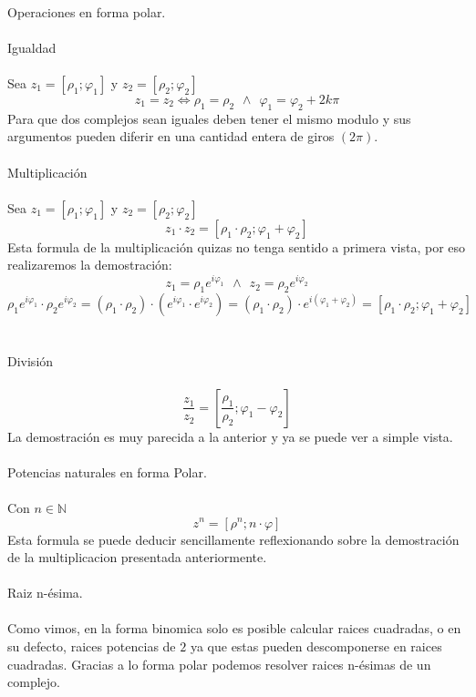 \documentclass[]{article}
\begin{document}
\\
\huge Operaciones en forma polar.
\\
\\
\Large Igualdad
\normalsize
\\
\\
Sea $z_1=[\rho_1;\varphi_1]$ y $z_2=[\rho_2;\varphi_2]$
$$
z_1 = z_2 \Leftrightarrow \rho_1 = \rho_2 \hspace{5pt} \wedge \hspace{5pt} \varphi_1 = \varphi_2 + 2k\pi
$$
Para que dos complejos sean iguales deben tener el mismo modulo y sus argumentos pueden diferir en una cantidad entera de giros $(2\pi)$.
\\
\\
\Large Multiplicación
\normalsize
\\
\\
Sea $z_1=[\rho_1;\varphi_1]$ y $z_2=[\rho_2;\varphi_2]$
$$
z_1 \cdot z_2 = [\rho_1 \cdot \rho_2 ;\varphi_1 + \varphi_2 ]
$$
Esta formula de la multiplicación quizas no tenga sentido a primera vista, por eso realizaremos la demostración:
$$
z_1 = \rho_1e^{i\varphi_1} \hspace{5pt} \wedge \hspace{5pt} z_2 = \rho_2e^{i\varphi_2}
$$
$$
\rho_1e^{i\varphi_1} \cdot \rho_2e^{i\varphi_2} = (\rho_1 \cdot \rho_2) \cdot (e^{i\varphi_1}\cdot e^{i\varphi_2}) = (\rho_1 \cdot \rho_2) \cdot e^{i(\varphi_1 + \varphi_2)} = [\rho_1 \cdot \rho_2 ;\varphi_1 + \varphi_2 ]
$$
\\
\\
\Large División
\normalsize
\\
\\
$$
\frac{z_1}{z_2} = [\frac{\rho_1}{\rho_2 };\varphi_1 - \varphi_2 ]
$$
La demostración es muy parecida a la anterior y ya se puede ver a simple vista.
\\
\\
\Large Potencias naturales en forma Polar.
\normalsize
\\
\\
Con $n \in \mathbb{N}$
$$
z^{n} = [\rho^{n}; n\cdot\varphi]
$$
Esta formula se puede deducir sencillamente reflexionando sobre la demostración de la multiplicacion presentada anteriormente.
\\
\\
\Large Raiz n-ésima.
\normalsize
\\
\\
Como vimos, en la forma binomica solo es posible calcular raices cuadradas, o en su defecto, raices potencias de $2$ ya que estas pueden descomponerse en raices cuadradas. Gracias a lo forma polar podemos resolver raices n-ésimas de un complejo.
\end{document}
